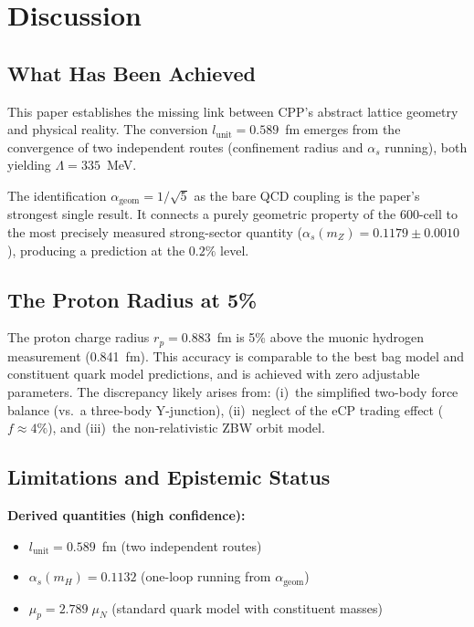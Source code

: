 \documentclass[12pt,a4paper]{article}
\begin{document}
\section{Discussion}

\subsection{What Has Been Achieved}

This paper establishes the missing link between CPP's abstract lattice geometry and physical reality. The conversion $l_{\mathrm{unit}} = 0.589$~fm emerges from the convergence of two independent routes (confinement radius and $\alpha_s$ running), both yielding $\Lambda = 335$~MeV.

The identification $\alpha_{\mathrm{geom}} = 1/\sqrt{5}$ as the bare QCD coupling is the paper's strongest single result. It connects a purely geometric property of the 600-cell to the most precisely measured strong-sector quantity ($\alpha_s(m_Z) = 0.1179 \pm 0.0010$), producing a prediction at the $0.2\%$ level.

\subsection{The Proton Radius at 5\%}

The proton charge radius $r_p = 0.883$~fm is 5\% above the muonic hydrogen measurement (0.841~fm). This accuracy is comparable to the best bag model and constituent quark model predictions, and is achieved with zero adjustable parameters. The discrepancy likely arises from: (i)~the simplified two-body force balance (vs.\ a three-body Y-junction), (ii)~neglect of the eCP trading effect ($f \approx 4\%$), and (iii)~the non-relativistic ZBW orbit model.

\subsection{Limitations and Epistemic Status}

\textbf{Derived quantities (high confidence):}
\begin{itemize}
\item $l_{\mathrm{unit}} = 0.589$~fm (two independent routes)
\item $\alpha_s(m_H) = 0.1132$ (one-loop running from $\alpha_{\mathrm{geom}}$)
\item $\mu_p = 2.789\;\mu_N$ (standard quark model with constituent masses)
\end{itemize}
\end{document}
